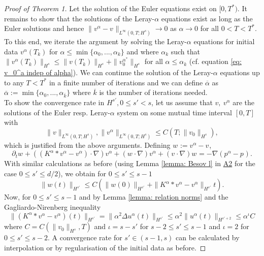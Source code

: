 \documentclass{amsart}
\begin{document}
\begin{proof}[Proof of Theorem 1]
Let the solution of the Euler equations exist on $[0, T^*)$. It remains to show that the solutions of the Leray-$\alpha$ equations exist as long as the Euler solutions and hence $\|v^{\alpha}-v^{}\|_{L^{\infty}(0,T;H^s)} \to 0 $ as $\alpha \to 0$ for all $0<T<T^*$. To this end, we iterate the argument by solving the Leray-$\alpha$ equations for initial data $v^{\alpha}(T_k)$ for $\alpha \leq \operatorname{min}\{\alpha_0, ..., \alpha_k\}$ and where $\alpha_k$ such that $\|v^{\alpha}(T_k)\|_{H^s} \leq \|v(T_k)\|_{H^s} + \|v_0^{\alpha^*}\|_{H^s}$ for all $\alpha \leq \alpha_k$ (cf. equation \eqref{eq: v_0^a indep of alpha}). We can continue the solution of the Leray-$\alpha$ equations up to any $T<T^*$ in a finite number of iterations and we can define $\overline{\alpha}$ as $\overline{\alpha}:=\operatorname{min}\{\alpha_0, ..., \alpha_{\overline{k}}\}$ where $\overline{k}$ is the number of iterations needed.\\

To show the convergence rate in $H^{s'}, 0\leq s'<s$, let us assume that $v,\ v^{\alpha}$ are the solutions of the Euler resp. Leray-$\alpha$ system on some mutual time interval $[0,T]$ with
\begin{equation}
\label{eq: Abschätzung v}
    \|v\|_{L^{\infty}(0,T;H^s)}, \|v^{\alpha}\|_{L^{\infty}(0,T;H^s)} \leq C(T; \|v_0\|_{H^s}),
\end{equation}
which is justified from the above arguments. Defining $w^{}:=v^{\alpha}-v^{}$,
$$ \partial_t w^{}+ ((K^{\alpha}*v^{\alpha} - v^{\alpha})\cdot \nabla) v^{\alpha} + (w^{} \cdot \nabla) v^{\alpha} + (v^{} \cdot \nabla) w^{} = -\nabla (p^{\alpha}-p^{}).$$
With similar calculations as before (using Lemma \ref{lemma: Besov l} in \hyperref[subsection: USeful estimates]{A2} for the case $0\leq s'\leq d/2$), we obtain for $0\leq s' \leq s-1$
$$ \|w(t)\|_{H^{s'}_{}} \leq C\left(\|w(0)\|_{H^{s'}_{}} + \|K^{\alpha}*v^{\alpha} - v^{\alpha}\|_{H^{s'}_{}}t\right).  $$
Now, for $0\leq s' \leq s-1$ and by Lemma \ref{lemma: relation norms} and the Gagliardo-Nirenberg inequality
$$ \|(K^{\alpha}*v^{\alpha}-v^{\alpha})(t)\|_{H^{s'}} = \|\alpha^2 \Delta u^{\alpha}(t)\|_{H^{s'}} \leq \alpha^2  \| u^{\alpha}(t)\|_{H^{s'+2}} \leq  \alpha^{\iota} C$$
where $C=C(\|v_0\|_{H^s}, T)$ and $\iota=s-s'$ for $s-2\leq s' \leq s-1$ and $\iota=2$ for $0\leq s'\leq s-2$. A convergence rate for $s' \in (s-1,s)$ can be calculated by interpolation or by regularisation of the initial data as before.
\end{proof}
\end{document}
